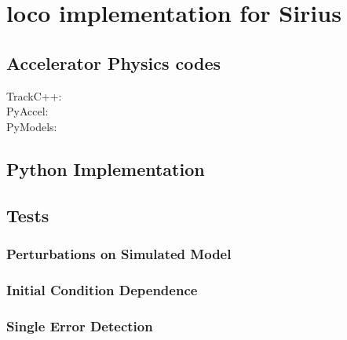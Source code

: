 \chapter{\gls{loco} implementation for Sirius}
\section{Accelerator Physics codes}
\begin{description}
    \item[TrackC++:]
    \item[PyAccel:]
    \item[PyModels:]
\end{description}
\section{Python Implementation}
\section{Tests}
\subsection{Perturbations on Simulated Model}
\subsection{Initial Condition Dependence}
\subsection{Single Error Detection}






